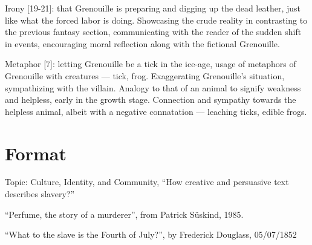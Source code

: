 \documentclass[a4paper,12pt]{article}
\begin{document}
Irony [19-21]: that Grenouille is preparing and digging up the dead leather, just like what the forced labor is doing. Showcasing the crude reality in contrasting to the previous fantasy section, communicating with the reader of the sudden shift in events, encouraging moral reflection along with the fictional Grenouille.

Metaphor [7]: letting Grenouille be a tick in the ice-age, usage of metaphors of Grenouille with creatures --- tick, frog. Exaggerating Grenouille's situation, sympathizing with the villain. Analogy to that of an animal to signify weakness and helpless, early in the growth stage. Connection and sympathy towards the helpless animal, albeit with a negative connatation --- leaching ticks, edible frogs.

\newpage
\section{Format}

Topic: Culture, Identity, and Community, ``How creative and persuasive text describes slavery?''

``Perfume, the story of a murderer'', from Patrick S\"uskind, 1985.

``What to the slave is the Fourth of July?'', by Frederick Douglass, 05/07/1852
\end{document}
